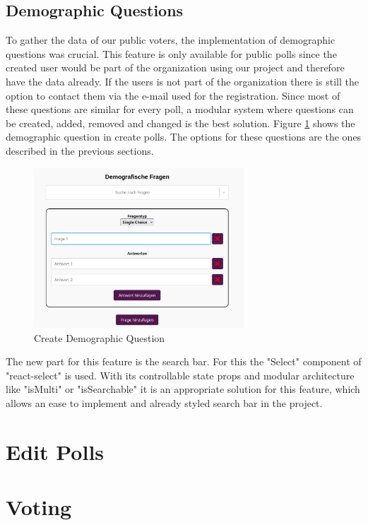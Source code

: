 \documentclass[a4paper,12pt]{report}
\begin{document}
\subsection{Demographic Questions}
To gather the data of our public voters, the implementation of demographic questions was crucial. This feature is only available for public polls since the created user would be part of the organization using our project and therefore have the data already. If the users is not part of the organization there is still the option to contact them via the e-mail used for the registration. Since most of these questions are similar for every poll, a modular system where questions can be created, added, removed and changed is the best solution. Figure \ref{fig:create_dem_que} shows the demographic question in create polls. The options for these questions are the ones described in the previous sections. 
\begin{figure}[h!]
	\centering
	\includegraphics[width=0.7\textwidth]{pics/demographic_question_create.jpg}
	\caption{Create Demographic Question}
	\label{fig:create_dem_que}
\end{figure}
\newline 
The new part for this feature is the search bar. For this the "Select" component of "react-select" is used. With its controllable state props and modular architecture like "isMulti" or "isSearchable" it is an appropriate solution for this feature, which allows an ease to implement and already styled search bar in the project. \parencite{reactselect}
\section{Edit Polls}
\section{Voting}
\end{document}
